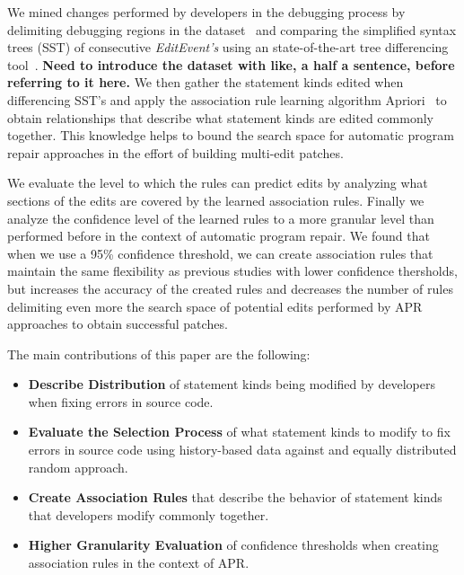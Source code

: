 \documentclass[sigconf]{acmart}
\newcommand{\todo}[1]
  {{\scriptsize \textbf{\color{red} {#1}}}}
\begin{document}
We mined changes performed by developers in the debugging
process by delimiting debugging regions in the 
dataset~\cite{msr18challenge} and comparing the simplified syntax
trees (SST) of consecutive \textit{EditEvent's} using an 
state-of-the-art tree differencing tool~\cite{Pawlik16Apted}.\todo{Need to
  introduce the dataset with like, a half a sentence, before referring to it here.}
We then gather the statement kinds edited when
differencing SST's and apply the association
rule learning algorithm Apriori~\cite{Agrawal94}
to obtain relationships that describe what statement kinds
are edited commonly together. This knowledge helps to 
bound the search space for automatic program repair approaches
in the effort of building multi-edit patches.

We evaluate the level to which the rules can predict edits
by analyzing what sections of the edits are covered by the 
learned association rules. 
Finally we analyze
the confidence level of the learned rules to a more granular 
level than performed before in the context of automatic
program repair. We found that when we use a 95\% confidence
threshold, we can create association
rules that maintain the same flexibility as previous
studies with lower confidence thersholds\cite{Soto18}, but increases
the accuracy of the created rules and decreases the number of rules
delimiting even more the search space of potential edits
performed by APR approaches to obtain successful patches.

The main contributions of this paper are the following:
\begin{itemize}
\item \textbf{Describe Distribution} of statement kinds being
modified by developers when fixing errors in source code. 

\item \textbf{Evaluate
the Selection Process} of what statement kinds to modify 
to fix errors in source code using history-based data against
and equally distributed random approach.

\item \textbf{Create Association Rules} that describe the behavior
of statement kinds that developers modify commonly together.

\item \textbf{Higher Granularity Evaluation} 
of confidence thresholds when creating
association rules in the context of APR.

\end{itemize}
\end{document}
